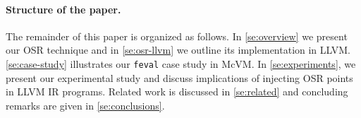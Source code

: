 

\paragraph{Structure of the paper.}
The remainder of this paper is organized as follows. In \mysection\ref{se:overview} we present our OSR technique and in \mysection\ref{se:osr-llvm} we outline its implementation in LLVM. \mysection\ref{se:case-study} illustrates our {\tt feval} case study in McVM. In \mysection\ref{se:experiments}, we present our experimental study and discuss implications of injecting OSR points in LLVM IR programs. Related work is discussed in \mysection\ref{se:related} and concluding remarks are given in \mysection\ref{se:conclusions}. %
